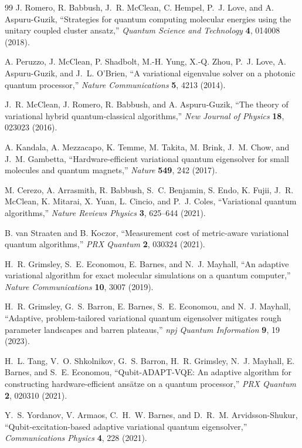 \documentclass[
  reprint,
  amsmath,
  amssymb,
  aps,
  pra,
  nofootinbib,
  superscriptaddress,
  floatfix
]{revtex4-2}
\begin{document}
\begin{thebibliography}{99}
J. Romero, R. Babbush, J.~R. McClean, C. Hempel, P.~J. Love, and A. Aspuru-Guzik,
``Strategies for quantum computing molecular energies using the unitary coupled cluster ansatz,''
\emph{Quantum Science and Technology} \textbf{4}, 014008 (2018).

A. Peruzzo, J. McClean, P. Shadbolt, M.-H. Yung, X.-Q. Zhou, P.~J. Love, A. Aspuru-Guzik, and J.~L. O'Brien,
``A variational eigenvalue solver on a photonic quantum processor,''
\emph{Nature Communications} \textbf{5}, 4213 (2014).

J.~R. McClean, J. Romero, R. Babbush, and A. Aspuru-Guzik,
``The theory of variational hybrid quantum-classical algorithms,''
\emph{New Journal of Physics} \textbf{18}, 023023 (2016).

A. Kandala, A. Mezzacapo, K. Temme, M. Takita, M. Brink, J.~M. Chow, and J.~M. Gambetta,
``Hardware-efficient variational quantum eigensolver for small molecules and quantum magnets,''
\emph{Nature} \textbf{549}, 242 (2017).

M. Cerezo, A. Arrasmith, R. Babbush, S.~C. Benjamin, S. Endo, K. Fujii, J.~R. McClean, K. Mitarai, X. Yuan, L. Cincio, and P.~J. Coles,
``Variational quantum algorithms,''
\emph{Nature Reviews Physics} \textbf{3}, 625--644 (2021).

B. van Straaten and B. Koczor,
``Measurement cost of metric-aware variational quantum algorithms,''
\emph{PRX Quantum} \textbf{2}, 030324 (2021).

H.~R. Grimsley, S.~E. Economou, E. Barnes, and N.~J. Mayhall,
``An adaptive variational algorithm for exact molecular simulations on a quantum computer,''
\emph{Nature Communications} \textbf{10}, 3007 (2019).

H.~R. Grimsley, G.~S. Barron, E. Barnes, S.~E. Economou, and N.~J. Mayhall,
``Adaptive, problem-tailored variational quantum eigensolver mitigates rough parameter landscapes and barren plateaus,''
\emph{npj Quantum Information} \textbf{9}, 19 (2023).

H.~L. Tang, V.~O. Shkolnikov, G.~S. Barron, H.~R. Grimsley, N.~J. Mayhall, E. Barnes, and S.~E. Economou,
``Qubit-ADAPT-VQE: An adaptive algorithm for constructing hardware-efficient ans\"atze on a quantum processor,''
\emph{PRX Quantum} \textbf{2}, 020310 (2021).

Y.~S. Yordanov, V. Armaos, C.~H.~W. Barnes, and D.~R.~M. Arvidsson-Shukur,
``Qubit-excitation-based adaptive variational quantum eigensolver,''
\emph{Communications Physics} \textbf{4}, 228 (2021).


\end{thebibliography}
\end{document}

